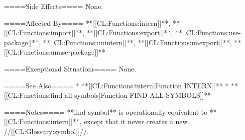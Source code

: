 ====Side Effects====
None.

====Affected By====
**[[CL:Functions:intern]]**, **[[CL:Functions:import]]**, **[[CL:Functions:export]]**, **[[CL:Functions:use-package]]**, **[[CL:Functions:unintern]]**, **[[CL:Functions:unexport]]**, **[[CL:Functions:unuse-package]]**

====Exceptional Situations====
None.

====See Also====
  * **[[CL:Functions:intern|Function INTERN]]**
  * **[[CL:Functions:find-all-symbols|Function FIND-ALL-SYMBOLS]]**

====Notes====
**find-symbol** is operationally equivalent to **[[CL:Functions:intern]]**, except that it never creates a new //[[CL:Glossary:symbol]]//.

